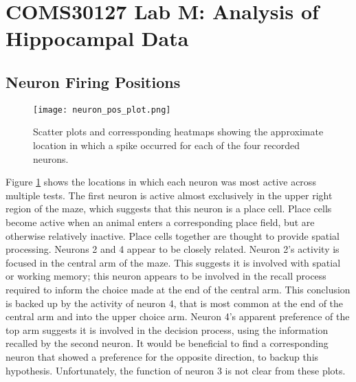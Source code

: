 \documentclass[a4paper, 10pt]{article}
\begin{document}
\section*{COMS30127 Lab M: Analysis of Hippocampal Data}

\subsection*{Neuron Firing Positions}
\begin{figure}[H]
  \centering
  \texttt{[image: neuron\_pos\_plot.png]}
  \caption{Scatter plots and corressponding heatmaps showing the approximate location in which a spike occurred for each of the four recorded neurons.}
  \label{fig:posplot}
\end{figure}

Figure \ref{fig:posplot} shows the locations in which each neuron was most
active across multiple tests. The first neuron is active almost exclusively in
the upper right region of the maze, which suggests that this neuron is a place
cell. Place cells become active when an animal enters a corresponding place
field, but are otherwise relatively inactive. Place cells together are thought
to provide spatial processing. Neurons 2 and 4 appear to be closely
related. Neuron 2's activity is focused in the central arm of the maze. This
suggests it is involved with spatial or working memory; this neuron appears to
be involved in the recall process required to inform the choice made at the end
of the central arm. This conclusion is backed up by the activity of neuron 4,
that is most common at the end of the central arm and into the upper choice
arm. Neuron 4's apparent preference of the top arm suggests it is involved in
the decision process, using the information recalled by the second neuron. It
would be beneficial to find a corresponding neuron that showed a preference for
the opposite direction, to backup this hypothesis. Unfortunately, the function
of neuron 3 is not clear from these plots.






\end{document}
